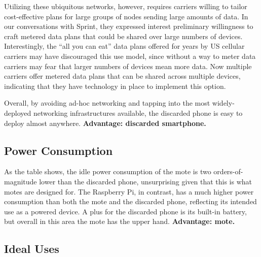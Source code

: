 Utilizing these ubiquitous networks, however, requires carriers willing to
tailor cost-effective plans for large groups of nodes sending large amounts
of data. In our conversations with Sprint, they expressed interest
preliminary willingness to craft metered data plans that could be shared over
large numbers of devices. Interestingly, the ``all you can eat'' data plans
offered for years by US cellular carriers may have discouraged this use
model, since without a way to meter data carriers may fear that larger
numbers of devices mean more data. Now multiple carriers offer metered data
plans that can be shared across multiple devices, indicating that they have
technology in place to implement this option.

Overall, by avoiding ad-hoc networking and tapping into the most
widely-deployed networking infrastructures available, the discarded phone is
easy to deploy almost anywhere. \textbf{Advantage: discarded smartphone.}

\subsection{Power Consumption}

As the table shows, the idle power consumption of the mote is two
orders-of-magnitude lower than the discarded phone, unsurprising given that
this is what motes are designed for. The Raspberry Pi, in contrast, has a
much higher power consumption than both the mote and the discarded phone,
reflecting its intended use as a powered device. A plus for the discarded
phone is its built-in battery, but overall in this area the mote has the
upper hand. \textbf{Advantage: mote.}

\subsection{Ideal Uses}
